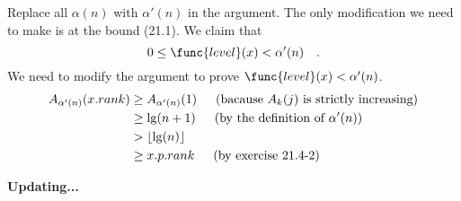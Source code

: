 Replace all $\alpha(n)$ with $\alpha'(n)$ in the argument.
The only modification we need to make is at the bound (21.1).
We claim that
\begin{equation*}
    0 \leq \func{level}(x) < \alpha'(n) \quad.
\end{equation*}
We need to modify the argument to prove $\func{level}(x) < \alpha'(n)$.
\begin{equation*}
\begin{split}
    A_{\alpha'(n)}(x.rank) & \geq A_{\alpha'(n)}(1)
    \text{\indent(bacause $A_k(j)$ is strictly increasing)} \\
    & \geq \lg (n + 1) 
    \text{\indent(by the definition of $\alpha'(n)$)} \\
    & > \lfloor \lg(n) \rfloor \\
    & \geq x.p.rank
    \text{\indent(by exercise 21.4-2)} \\
\end{split}
\end{equation*}




\centerline{\textbf{Updating...}}

